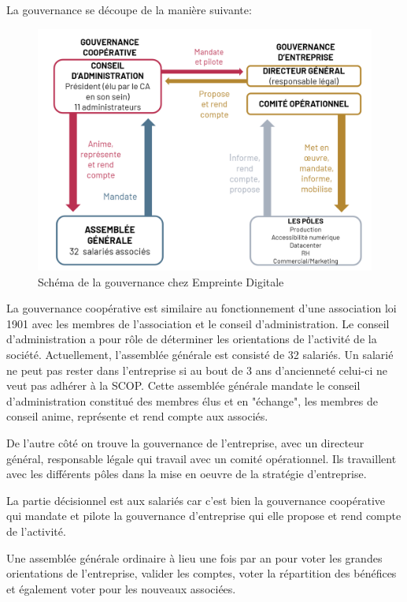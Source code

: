 \documentclass[12pt]{article}
\begin{document}
\newpage
La gouvernance se découpe de la manière suivante:
\begin{figure}[!ht]
    \centering
    \includegraphics[width=\textwidth]{src/gouvernance_ed.png}
    \caption{Schéma de la gouvernance chez Empreinte Digitale}
    \label{fig:gouvernance_ed}
\end{figure}

La gouvernance coopérative est similaire au fonctionnement d'une association loi 1901 avec les membres de l'association et le conseil d'administration. 
Le conseil d'administration a pour rôle de déterminer les orientations de l'activité de la société. 
Actuellement, l'assemblée générale est consisté de 32 salariés. 
Un salarié ne peut pas rester dans l'entreprise si au bout de 3 ans d'ancienneté celui-ci ne veut pas adhérer à la \gls{SCOP}. 
Cette assemblée générale mandate le conseil d'administration constitué des membres élus et en "échange", les membres de conseil anime, représente et rend compte aux associés.

De l'autre côté on trouve la gouvernance de l'entreprise, avec un directeur général, responsable légale qui travail avec un comité opérationnel. 
Ils travaillent avec les différents pôles dans la mise en oeuvre de la stratégie d'entreprise.

La partie décisionnel est aux salariés car c'est bien la gouvernance coopérative qui mandate et pilote la gouvernance d'entreprise qui elle propose et rend compte de l'activité.

Une assemblée générale ordinaire à lieu une fois par an pour voter les grandes orientations de l'entreprise, valider les comptes, voter la répartition des bénéfices et également voter pour les nouveaux associées.
\end{document}
